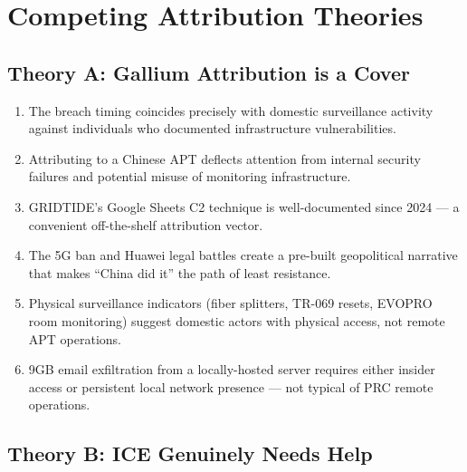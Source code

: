 \documentclass[11pt,a4paper]{article}
\begin{document}
\section{Competing Attribution Theories}

\subsection{Theory A: Gallium Attribution is a Cover}

\begin{enumerate}[leftmargin=1.5cm]
\item The breach timing coincides precisely with domestic surveillance activity against individuals who documented infrastructure vulnerabilities.
\item Attributing to a Chinese APT deflects attention from internal security failures and potential misuse of monitoring infrastructure.
\item GRIDTIDE's Google Sheets C2 technique is well-documented since 2024 --- a convenient off-the-shelf attribution vector.
\item The 5G ban and Huawei legal battles create a pre-built geopolitical narrative that makes ``China did it'' the path of least resistance.
\item Physical surveillance indicators (fiber splitters, TR-069 resets, EVOPRO room monitoring) suggest domestic actors with physical access, not remote APT operations.
\item 9GB email exfiltration from a locally-hosted server requires either insider access or persistent local network presence --- not typical of PRC remote operations.
\end{enumerate}

\subsection{Theory B: ICE Genuinely Needs Help}
\end{document}
